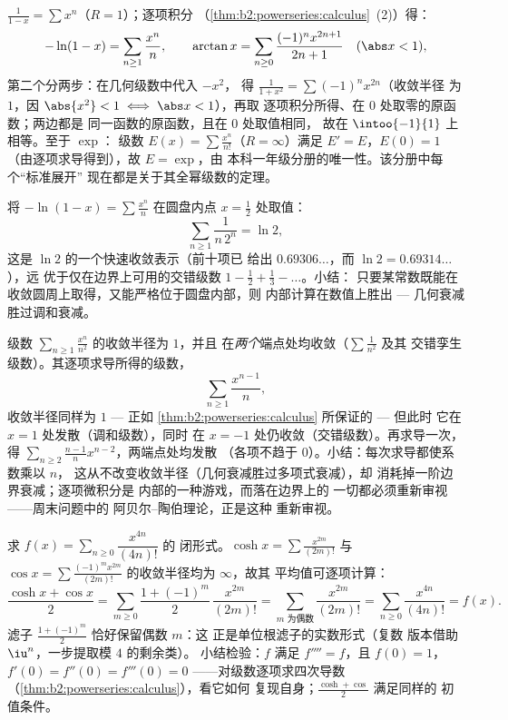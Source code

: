 \begin{example}\label{ex:b2:powerseries:classics}
$\displaystyle\frac{1}{1 - x} = \sum x^n$（$R = 1$）；逐项积分
（\cref{thm:b2:powerseries:calculus}~(2)）得：
\[
-\ln(1 - x) = \sum_{n\geq1} \frac{x^n}{n},
\qquad
\arctan x = \sum_{n \geq 0} \frac{(-1)^n x^{2n+1}}{2n+1}
\quad (\abs x < 1),
\]
第二个分两步：在几何级数中代入 $-x^2$，
得 $\frac{1}{1+x^2} = \sum(-1)^nx^{2n}$（收敛半径
为 $1$，因 $\abs{x^2} < 1 \iff \abs x < 1$），再取
逐项积分所得、在 $0$ 处取零的原函数；两边都是
同一函数的原函数，且在 $0$ 处取值相同，
故在 $\intoo{-1}{1}$ 上相等。至于 $\exp$：
级数 $E(x) = \sum \frac{x^n}{n!}$（$R = \infty$）满足
$E' = E$，$E(0) = 1$（由逐项求导得到），故 $E = \exp$，由
本科一年级分册的唯一性。该分册中每个“标准展开”
现在都是关于其全幂级数的定理。
\end{example}

\begin{example}[在圆盘内部计算一个对数]\label{ex:b2:powerseries:lntwo}
将 $-\ln(1-x) = \sum\frac{x^n}{n}$ 在圆盘内点
$x = \frac12$ 处取值：
\[
\sum_{n\geq1}\frac{1}{n\,2^n} = \ln 2 ,
\]
这是 $\ln 2$ 的一个快速收敛表示（前十项已
给出 $0.69306\ldots$，而 $\ln 2 = 0.69314\ldots$），远
优于仅在边界上可用的交错级数 $1 - \frac12 + \frac13 -
\dots$。小结：
只要某常数既能在收敛圆周上取得，又能严格位于圆盘内部，则
内部计算在数值上胜出 --- 几何衰减
胜过调和衰减。
\end{example}

\begin{example}\label{ex:b2:powerseries:boundaryloss}
级数 $\sum_{n\geq1}\frac{x^n}{n^2}$ 的收敛半径为 $1$，并且
在\emph{两个}端点处均收敛（$\sum\frac1{n^2}$ 及其
交错孪生级数）。其逐项求导所得的级数，
\[
\sum_{n\geq1}\frac{x^{n-1}}{n} ,
\]
收敛半径同样为 $1$ --- 正如
\cref{thm:b2:powerseries:calculus} 所保证的 --- 但此时
它在 $x = 1$ 处发散（调和级数），同时
在 $x = -1$ 处仍收敛（交错级数）。再求导一次，得
$\sum_{n\geq2}\frac{n-1}{n}x^{n-2}$，两端点处均发散
（各项不趋于 $0$）。小结：每次求导都使系数乘以 $n$，
这从不改变收敛半径（几何衰减胜过多项式衰减），却
消耗掉一阶边界衰减；逐项微积分是
内部的一种游戏，而落在边界上的
一切都必须重新审视 ——周末问题中的
阿贝尔–陶伯理论，正是这种
重新审视。
\end{example}

\begin{example}\label{ex:b2:powerseries:quarter}
求 $f(x) = \sum_{n\geq0} \dfrac{x^{4n}}{(4n)!}$ 的
闭形式。$\cosh x = \sum \frac{x^{2m}}{(2m)!}$ 与 $\cos x =
\sum \frac{(-1)^m x^{2m}}{(2m)!}$ 的收敛半径均为 $\infty$，故其
平均值可逐项计算：
\[
\frac{\cosh x + \cos x}{2}
= \sum_{m\geq0}\frac{1 + (-1)^m}{2}\,\frac{x^{2m}}{(2m)!}
= \sum_{m \text{ 为偶数}}\frac{x^{2m}}{(2m)!}
= \sum_{n\geq0}\frac{x^{4n}}{(4n)!} = f(x) .
\]
滤子 $\frac{1+(-1)^m}{2}$ 恰好保留偶数 $m$：这
正是单位根滤子的实数形式（复数
版本借助 $\iu^n$，一步提取模 $4$ 的剩余类）。
小结检验：$f$ 满足 $f'''' = f$，且 $f(0) = 1$，
$f'(0) = f''(0) = f'''(0) = 0$ ——对级数逐项求四次导数
（\cref{thm:b2:powerseries:calculus}），看它如何
复现自身；$\frac{\cosh + \cos}{2}$ 满足同样的
初值条件。
\end{example}

